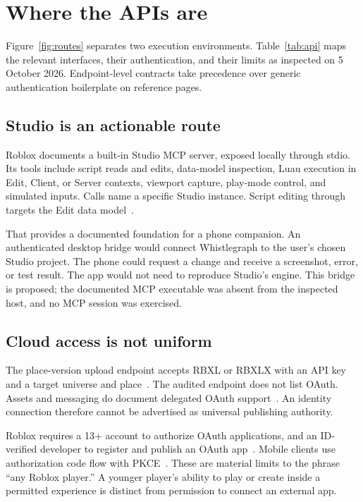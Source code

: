 \documentclass[10pt,letterpaper,twocolumn]{article}
\newcommand{\pc}[1]{{\ttfamily\small\path{#1}}}
\begin{document}
\section{Where the APIs are}
Figure~\ref{fig:routes} separates two execution environments. Table~\ref{tab:api} maps the relevant interfaces, their authentication, and their limits as inspected on 5 October 2026. Endpoint-level contracts take precedence over generic authentication boilerplate on reference pages.

\subsection{Studio is an actionable route}
Roblox documents a built-in Studio MCP server, exposed locally through stdio. Its tools include script reads and edits, data-model inspection, Luau execution in Edit, Client, or Server contexts, viewport capture, play-mode control, and simulated inputs. Calls name a specific Studio instance. Script editing through \pc{multi_edit} targets the Edit data model~\cite{mcp}.

That provides a documented foundation for a phone companion. An authenticated desktop bridge would connect Whistlegraph to the user's chosen Studio project. The phone could request a change and receive a screenshot, error, or test result. The app would not need to reproduce Studio's engine. This bridge is proposed; the documented MCP executable was absent from the inspected host, and no MCP session was exercised.

\subsection{Cloud access is not uniform}
The place-version upload endpoint accepts RBXL or RBXLX with an API key and a target universe and place~\cite{publishing,places}. The audited endpoint does not list OAuth. Assets and messaging do document delegated OAuth support~\cite{assets,messaging}. An identity connection therefore cannot be advertised as universal publishing authority.

Roblox requires a 13+ account to authorize OAuth applications, and an ID-verified developer to register and publish an OAuth app~\cite{oauth}. Mobile clients use authorization code flow with PKCE~\cite{pkce}. These are material limits to the phrase ``any Roblox player.'' A younger player's ability to play or create inside a permitted experience is distinct from permission to connect an external app.
\end{document}
